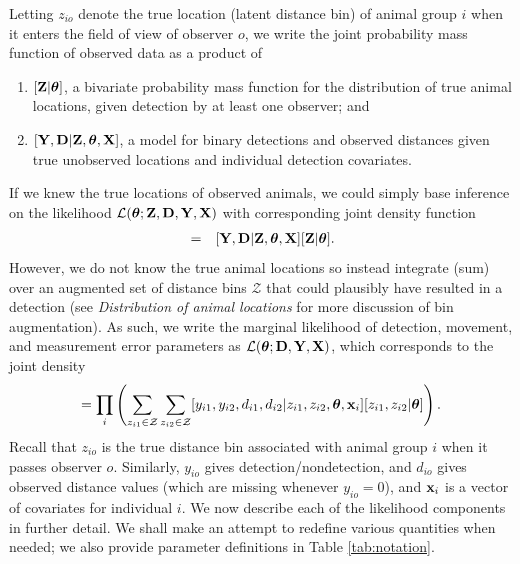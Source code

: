 \documentclass[aoas,preprint]{imsart}
\numberwithin{equation}{section}
\theoremstyle{plain}
\begin{document}
Letting $z_{io}$ denote the true location (latent distance bin) of animal group $i$ when it enters the field of view of observer $o$, we write the joint probability mass function of observed data as a product of
\begin{enumerate}
   \item $[{\bf Z}|\boldsymbol{\theta}]$, a bivariate probability mass function for the distribution of true animal locations, given detection by at least one observer; and
   \item $[{\bf Y},{\bf D}|{\bf Z},\boldsymbol{\theta},{\bf X}]$, a model for binary detections and observed distances given true unobserved locations and individual detection covariates.
\end{enumerate}
If we knew the true locations of observed animals, we could simply base inference on the likelihood $\mathcal{L}(\boldsymbol{\theta};{\bf Z},{\bf D},{\bf Y},{\bf X})$ with corresponding joint density function
\begin{eqnarray*}
  [{\bf Z},{\bf D},{\bf Y}|\boldsymbol{\theta},{\bf X}] & = & [{\bf Y},{\bf D}|{\bf Z},\boldsymbol{\theta},{\bf X}][{\bf Z}|\boldsymbol{\theta}].
\end{eqnarray*}
However, we do not know the true animal locations so instead integrate (sum) over an augmented set of distance bins $\mathcal{Z}$ that could plausibly have resulted in a detection (see \textit{Distribution of animal locations} for more discussion of bin augmentation).
As such, we write the marginal likelihood of detection, movement, and measurement error parameters as $\mathcal{L}(\boldsymbol{\theta};{\bf D},{\bf Y},{\bf X})$, which corresponds to the joint density
\begin{equation}
  [{\bf Y},{\bf D}|\boldsymbol{\theta},{\bf X}] = \prod_i \left( \sum_{z_{i1} \in \mathcal{Z}} \sum_{z_{i2} \in \mathcal{Z}} [y_{i1},y_{i2}, d_{i1}, d_{i2}|z_{i1} , z_{i2}, \boldsymbol{\theta} , {\bf x}_i][z_{i1},z_{i2}  |\boldsymbol{\theta}]
   \right).
  \label{eq:lik}
\end{equation}
Recall that $z_{i o}$ is the true distance bin associated with animal group $i$ when it passes observer $o$.  Similarly, $y_{io}$ gives detection/nondetection, and $d_{io}$ gives observed distance values (which are missing whenever $y_{io}=0$), and $\textbf{x}_i$ is a vector of covariates for individual $i$.  We now describe each of the likelihood components in further detail.  We shall make an attempt to redefine various quantities when needed; we also provide parameter definitions in Table \ref{tab:notation}.
\end{document}
